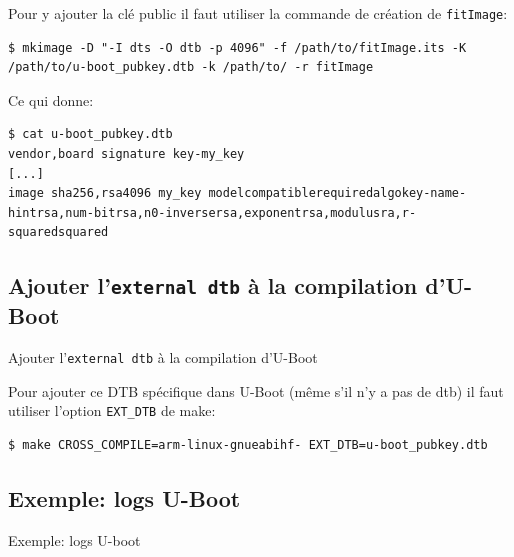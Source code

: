 \documentclass[aspectratio=169]{beamer}
\begin{document}
\begin{frame}[fragile]
Pour y ajouter la clé public il faut utiliser la commande de création de \texttt{fitImage}:
\begin{lstlisting}[style=shell]
$ mkimage -D "-I dts -O dtb -p 4096" -f /path/to/fitImage.its -K /path/to/u-boot_pubkey.dtb -k /path/to/ -r fitImage
\end{lstlisting}
Ce qui donne:
\begin{lstlisting}[style=shell]
$ cat u-boot_pubkey.dtb
vendor,board signature key-my_key
[...]
image sha256,rsa4096 my_key modelcompatiblerequiredalgokey-name-hintrsa,num-bitrsa,n0-inversersa,exponentrsa,modulusra,r-squaredsquared
\end{lstlisting}     
\end{frame}


\subsection{Ajouter l'\texttt{external dtb} à la compilation d'U-Boot}

\begin{frame}
\begin{center}
\large{Ajouter l'\texttt{external dtb} à la compilation d'U-Boot}
\end{center}
\end{frame}

\begin{frame}[fragile]
Pour ajouter ce DTB spécifique dans U-Boot (même s'il n'y a pas de dtb) il faut utiliser l'option \texttt{EXT\_DTB} de make:
\begin{lstlisting}[style=shell]
$ make CROSS_COMPILE=arm-linux-gnueabihf- EXT_DTB=u-boot_pubkey.dtb
\end{lstlisting}
\end{frame}


\subsection{Exemple: logs U-Boot}

\begin{frame}
\begin{center}
\large{Exemple: logs U-boot}
\end{center}
\end{frame}
\end{document}
